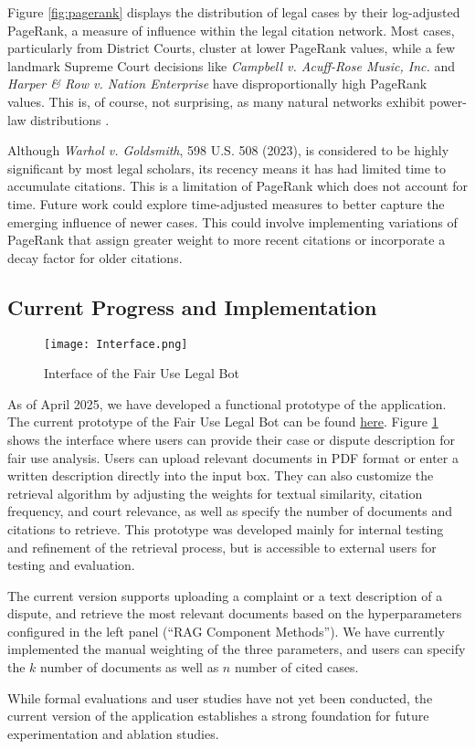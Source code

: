 Figure \ref{fig:pagerank} displays the distribution of legal cases by their log-adjusted PageRank, a measure of influence within the legal citation network. Most cases, particularly from District Courts, cluster at lower PageRank values, while a few landmark Supreme Court decisions like \textit{Campbell v. Acuff-Rose Music, Inc.} and \textit{Harper \& Row v. Nation Enterprise} have disproportionally high PageRank values. This is, of course, not surprising, as many natural networks exhibit power-law distributions \cite{33_ScaleFreeNetwork}.

Although \textit{Warhol v. Goldsmith}, 598 U.S. 508 (2023), is considered to be highly significant by most legal scholars, its recency means it has had limited time to accumulate citations. This is a limitation of PageRank which does not account for time. Future work could explore time-adjusted measures to better capture the emerging influence of newer cases. This could involve implementing variations of PageRank that assign greater weight to more recent citations or incorporate a decay factor for older citations.

\subsection{Current Progress and Implementation}

\begin{figure}[h]
    \centering
    \texttt{[image: Interface.png]}
    \caption{Interface of the Fair Use Legal Bot}
    \label{fig:interface}
\end{figure}

As of April 2025, we have developed a functional prototype of the application. The current prototype of the Fair Use Legal Bot can be found \href{https://fairuselegalbot-main.streamlit.app/}{here}. Figure \ref{fig:interface} shows the interface where users can provide their case or dispute description for fair use analysis. Users can upload relevant documents in PDF format or enter a written description directly into the input box. They can also customize the retrieval algorithm by adjusting the weights for textual similarity, citation frequency, and court relevance, as well as specify the number of documents and citations to retrieve. This prototype was developed mainly for internal testing and refinement of the retrieval process, but is accessible to external users for testing and evaluation.

The current version supports uploading a complaint or a text description of a dispute, and retrieve the most relevant documents based on the hyperparameters configured in the left panel (``RAG Component Methods”). We have currently implemented the manual weighting of the three parameters, and users can specify the $k$ number of documents as well as $n$ number of cited cases. 

While formal evaluations and user studies have not yet been conducted, the current version of the application establishes a strong foundation for future experimentation and ablation studies.
